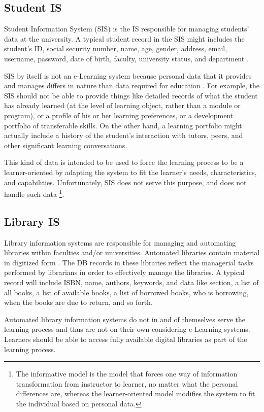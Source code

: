 \documentclass[12pt,a4paper,final,twoside,onecolumn,titlepage]{book}
\begin{document}
\subsection{Student IS} 
Student Information System (SIS) is the \gls{IS} responsible for managing students' data at the university. A typical student record in the SIS might includes the student's ID, social security number, name, age, gender, address, email, username, password, date of birth, faculty, university status, and department \cite{UMIS47}.

SIS by itself is not an e-Learning system because personal data that it provides and manages differs in nature than data required for education \cite{EV01}. For example, the SIS should not be able to provide things like detailed records of what the student has already learned (at the level of learning object, rather than a module or program), or a profile of his or her learning preferences, or a development portfolio of transferable skills. On the other hand, a learning portfolio might actually include a history of the student's interaction with tutors, peers, and other significant learning conversations.

This kind of data is intended to be used to force the learning process to be a learner-oriented by adapting the system to fit the learner's needs, characteristics, and capabilities. Unfortunately, SIS does not serve this purpose, and does not handle such data \footnote{The informative model is the model that forces one way of information transformation from instructor to learner, no matter what the personal differences are, whereas the learner-oriented model modifies the system to fit the individual based on personal data.}.

\subsection{Library IS}
Library information systems are responsible for managing and automating libraries within faculties and/or universities. Automated libraries contain material in digitized form \cite{UMIS39}. The \gls{DB} records in these libraries reflect the managerial tasks performed by librarians in order to effectively manage the libraries. A typical record will include ISBN, name, authors, keywords, and data like section, a list of all books, a list of available books, a list of borrowed books, who is borrowing, when the books are due to return, and so forth.

Automated library information systems do not in and of themselves serve the learning process and thus are not on their own considering e-Learning systems. Learners should be able to access fully available digital libraries as part of the learning process.
\end{document}
